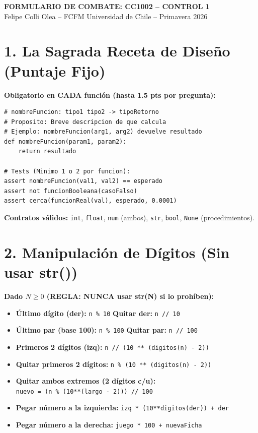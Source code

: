 \documentclass[8pt,twocolumn]{article}
\begin{document}
\begin{center}
    \textbf{\normalsize FORMULARIO DE COMBATE: CC1002 -- CONTROL 1} \\
    \tiny Felipe Colli Olea -- FCFM Universidad de Chile -- Primavera 2026
\end{center}

\section{1. La Sagrada Receta de Diseño (Puntaje Fijo)}
\textbf{Obligatorio en CADA función (hasta 1.5 pts por pregunta):}
\begin{verbatim}
# nombreFuncion: tipo1 tipo2 -> tipoRetorno
# Proposito: Breve descripcion de que calcula
# Ejemplo: nombreFuncion(arg1, arg2) devuelve resultado
def nombreFuncion(param1, param2):
    return resultado

# Tests (Minimo 1 o 2 por funcion):
assert nombreFuncion(val1, val2) == esperado
assert not funcionBooleana(casoFalso)
assert cerca(funcionReal(val), esperado, 0.0001)
\end{verbatim}
\textbf{Contratos válidos:} \texttt{int}, \texttt{float}, \texttt{num} (ambos), \texttt{str}, \texttt{bool}, \texttt{None} (procedimientos).

\section{2. Manipulación de Dígitos (Sin usar str())}
\textbf{Dado $N \ge 0$ (REGLA: NUNCA usar str(N) si lo prohíben):}
\begin{itemize}
    \item \textbf{Último dígito (der):} \texttt{n \% 10} \quad \textbf{Quitar der:} \texttt{n // 10}
    \item \textbf{Último par (base 100):} \texttt{n \% 100} \quad \textbf{Quitar par:} \texttt{n // 100}
    \item \textbf{Primeros 2 dígitos (izq):} \texttt{n // (10 ** (digitos(n) - 2))}
    \item \textbf{Quitar primeros 2 dígitos:} \texttt{n \% (10 ** (digitos(n) - 2))}
    \item \textbf{Quitar ambos extremos (2 dígitos c/u):} \\
    \texttt{nuevo = (n \% (10**(largo - 2))) // 100}
    \item \textbf{Pegar número a la izquierda:} \texttt{izq * (10**digitos(der)) + der}
    \item \textbf{Pegar número a la derecha:} \texttt{juego * 100 + nuevaFicha}
\end{itemize}
\end{document}
